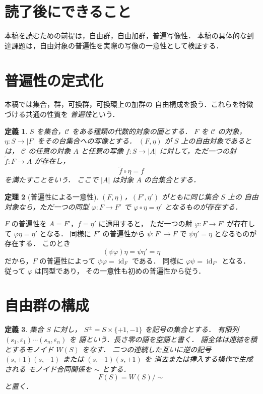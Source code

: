 \documentclass[a5paper,10pt,onecolumn]{jsarticle}
\makeatletter
\theoremstyle{mathnotetheorem}
\newtheorem{theorem}{定理}[section]
\newtheorem{definition}[theorem]{定義}
\renewcommand{\proofname}{証明}
\renewenvironment{proof}[1][\proofname]{%
  \par\pushQED{\qed}\normalfont\topsep4\p@\@plus2\p@\relax
  \trivlist\item[\hskip\labelsep\bfseries #1]\ignorespaces
}{\popQED\endtrivlist\@endpefalse}
\makeatother
\begin{document}
\section*{読了後にできること}
本稿を読むための前提は，自由群，自由加群，普遍写像性．
本稿の具体的な到達課題は，自由対象の普遍性を実際の写像の一意性として検証する．

\section{普遍性の定式化}

本稿では集合，群，可換群，可換環上の加群の
自由構成を扱う．これらを特徴づける共通の性質を
\emph{普遍性}という．

\begin{definition}
$S$ を集合，$\mathcal C$ をある種類の代数的対象の圏とする．
$F$ を $\mathcal C$ の対象，$\eta:S\to|F|$ をその台集合への写像とする．
$(F,\eta)$ が $S$ 上の\emph{自由対象}であるとは，
$\mathcal C$ の任意の対象 $A$ と任意の写像
$f:S\to|A|$ に対して，ただ一つの射
$\widetilde f:F\to A$ が存在し，
\[
 \widetilde f\circ\eta=f
\]
を満たすことをいう．
ここで $|A|$ は対象 $A$ の台集合とする．
\end{definition}

\begin{theorem}[普遍性による一意性]\label{thm:universal-unique}
$(F,\eta)$，$(F',\eta')$ がともに同じ集合 $S$ 上の
自由対象なら，ただ一つの同型
$\varphi:F\to F'$ で
$\varphi\circ\eta=\eta'$ となるものが存在する．
\end{theorem}
\begin{proof}
$F$ の普遍性を $A=F'$，$f=\eta'$ に適用すると，
ただ一つの射 $\varphi:F\to F'$ が存在して
$\varphi\eta=\eta'$ となる．
同様に $F'$ の普遍性から
$\psi:F'\to F$ で $\psi\eta'=\eta$ となるものが存在する．
このとき
\[
 (\psi\varphi)\eta=\psi\eta'=\eta
\]
だから，$F$ の普遍性によって
$\psi\varphi=\operatorname{id}_F$ である．
同様に $\varphi\psi=\operatorname{id}_{F'}$ となる．
従って $\varphi$ は同型であり，
その一意性も初めの普遍性から従う．
\end{proof}

\section{自由群の構成}

\begin{definition}
集合 $S$ に対し，
$S^\pm=S\times\{+1,-1\}$ を記号の集合とする．
有限列 $(s_1,\varepsilon_1)\cdots(s_n,\varepsilon_n)$ を
\emph{語}という．長さ零の語を空語と書く．
語全体は連結を積とするモノイド $W(S)$ をなす．
二つの連続した互いに逆の記号
$(s,+1)(s,-1)$ または $(s,-1)(s,+1)$ を
消去または挿入する操作で生成される
モノイド合同関係を $\sim$ とする．
\[
 F(S)=W(S)/{\sim}
\]
と置く．
\end{definition}
\end{document}
